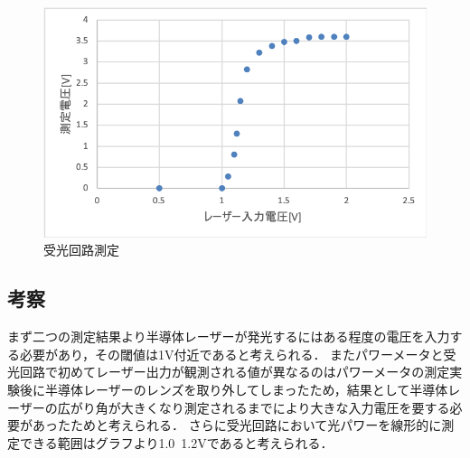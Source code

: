 \documentclass[11pt, a4paper,twocolumn]{jarticle}
\begin{document}
\begin{figure}[ht]
 \begin{center}
  \includegraphics[width=0.8\linewidth]{fig3.png}
 \end{center}
 \caption{受光回路測定}
 \label{fig:3}
\end{figure}

\subsection{考察}
まず二つの測定結果より半導体レーザーが発光するにはある程度の電圧を入力する必要があり，その閾値は1V付近であると考えられる．
またパワーメータと受光回路で初めてレーザー出力が観測される値が異なるのはパワーメータの測定実験後に半導体レーザーのレンズを取り外してしまったため，結果として半導体レーザーの広がり角が大きくなり測定されるまでにより大きな入力電圧を要する必要があったためと考えられる．
さらに受光回路において光パワーを線形的に測定できる範囲はグラフより1.0~1.2Vであると考えられる．

\newpage
\end{document}
